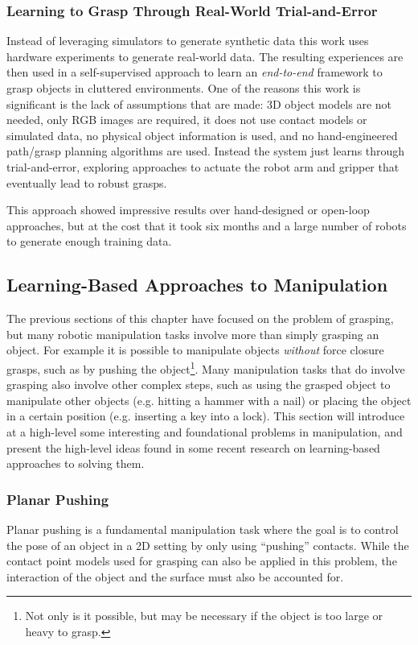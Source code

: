 \subsubsection{Learning to Grasp Through Real-World Trial-and-Error\cite{LevinePastorEtAl2018}}
Instead of leveraging simulators to generate synthetic data this work uses hardware experiments to generate real-world data. The resulting experiences are then used in a self-supervised approach to learn an \textit{end-to-end} framework to grasp objects in cluttered environments. One of the reasons this work is significant is the lack of assumptions that are made: 3D object models are not needed, only RGB images are required, it does not use contact models or simulated data, no physical object information is used, and no hand-engineered path/grasp planning algorithms are used.
Instead the system just learns through trial-and-error, exploring approaches to actuate the robot arm and gripper that eventually lead to robust grasps.

This approach showed impressive results over hand-designed or open-loop approaches, but at the cost that it took six months and a large number of robots to generate enough training data.

\subsection{Learning-Based Approaches to Manipulation} \label{subsec:manipulationlearning}
The previous sections of this chapter have focused on the problem of grasping, but many robotic manipulation tasks involve more than simply grasping an object. For example it is possible to manipulate objects \textit{without} force closure grasps, such as by pushing the object\footnote{Not only is it possible, but may be necessary if the object is too large or heavy to grasp.}. Many manipulation tasks that do involve grasping also involve other complex steps, such as using the grasped object to manipulate other objects (e.g. hitting a hammer with a nail) or placing the object in a certain position (e.g. inserting a key into a lock). This section will introduce at a high-level some interesting and foundational problems in manipulation, and present the high-level ideas found in some recent research on learning-based approaches to solving them.

\subsubsection{Planar Pushing}
Planar pushing is a fundamental manipulation task where the goal is to control the pose of an object in a 2D setting by only using ``pushing'' contacts. While the contact point models used for grasping can also be applied in this problem, the interaction of the object and the surface must also be accounted for. 

